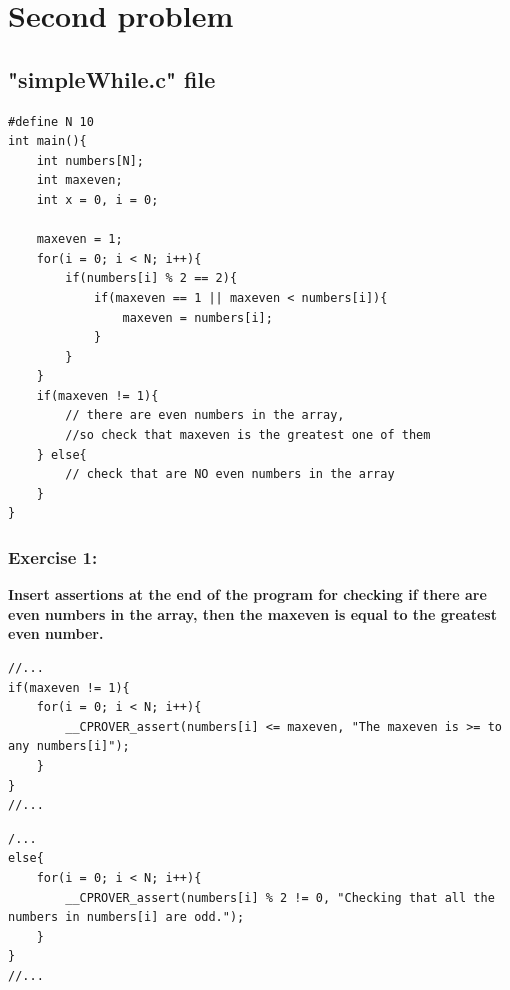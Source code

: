 \documentclass[a4paper,12pt]{article}
\begin{document}
\section{Second problem}
\subsection{"simpleWhile.c" file}

\begin{lstlisting}
#define N 10
int main(){
    int numbers[N];
    int maxeven;
    int x = 0, i = 0;
    
    maxeven = 1;
    for(i = 0; i < N; i++){
        if(numbers[i] % 2 == 2){
            if(maxeven == 1 || maxeven < numbers[i]){
                maxeven = numbers[i];
            }
        }
    }
    if(maxeven != 1){
        // there are even numbers in the array,
        //so check that maxeven is the greatest one of them
    } else{
        // check that are NO even numbers in the array
    }
}
\end{lstlisting}

\subsubsection{Exercise 1:}
\textbf{Insert assertions at the end of the program for checking if there are even numbers in the array, then the maxeven is equal to the greatest even number.\\}

\begin{lstlisting}
//...
if(maxeven != 1){
    for(i = 0; i < N; i++){
        __CPROVER_assert(numbers[i] <= maxeven, "The maxeven is >= to any numbers[i]");
    }
}
//...
\end{lstlisting}


\begin{lstlisting}
/...
else{
    for(i = 0; i < N; i++){
        __CPROVER_assert(numbers[i] % 2 != 0, "Checking that all the numbers in numbers[i] are odd.");
    }
}
//...
\end{lstlisting}
\end{document}
